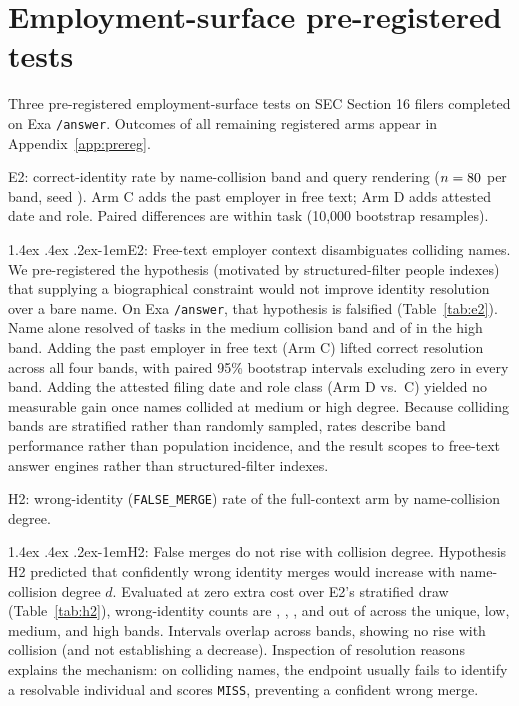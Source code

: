 \documentclass[11pt]{article}
\makeatletter
\renewcommand\paragraph{\@startsection{paragraph}{4}{\z@}%
  {1.4ex \@plus .4ex \@minus .2ex}{-1em}{\normalfont\normalsize\bfseries}}
\makeatother
\begin{document}
\section{Employment-surface pre-registered tests}
\label{sec:employment}

Three pre-registered employment-surface tests on SEC Section 16 filers completed on Exa \texttt{/answer}. Outcomes of all remaining registered arms appear in Appendix~\ref{app:prereg}.

\begin{table}[!tb]
\centering\small

\caption{E2: correct-identity rate by name-collision band and query rendering ($n=\tiEtwoN{}$ per band, seed \tiEtwoSeed{}). Arm C adds the past employer in free text; Arm D adds attested date and role. Paired differences are within task (10,000 bootstrap resamples).}
\label{tab:e2}
\end{table}

\paragraph{E2: Free-text employer context disambiguates colliding names.}
We pre-registered the hypothesis (motivated by structured-filter people indexes) that supplying a biographical constraint would not improve identity resolution over a bare name. On Exa \texttt{/answer}, that hypothesis is falsified (Table~\ref{tab:e2}). Name alone resolved \tiEtwoMAK{} of \tiEtwoMAN{} tasks in the medium collision band and \tiEtwoHAK{} of \tiEtwoHAN{} in the high band. Adding the past employer in free text (Arm C) lifted correct resolution across all four bands, with paired 95\% bootstrap intervals excluding zero in every band. Adding the attested filing date and role class (Arm D vs.\ C) yielded no measurable gain once names collided at medium or high degree. Because colliding bands are stratified rather than randomly sampled, rates describe band performance rather than population incidence, and the result scopes to free-text answer engines rather than structured-filter indexes.

\begin{table}[!tb]
\centering\small

\caption{H2: wrong-identity (\texttt{FALSE\_MERGE}) rate of the full-context arm by name-collision degree.}
\label{tab:h2}
\end{table}

\paragraph{H2: False merges do not rise with collision degree.}
Hypothesis H2 predicted that confidently wrong identity merges would increase with name-collision degree $d$. Evaluated at zero extra cost over E2's stratified draw (Table~\ref{tab:h2}), wrong-identity counts are \tiHtwoUK{}, \tiHtwoLK{}, \tiHtwoMK{}, and \tiHtwoHK{} out of \tiHtwoUN{} across the unique, low, medium, and high bands. Intervals overlap across bands, showing no rise with collision (and not establishing a decrease). Inspection of resolution reasons explains the mechanism: on colliding names, the endpoint usually fails to identify a resolvable individual and scores \texttt{MISS}, preventing a confident wrong merge.
\end{document}
